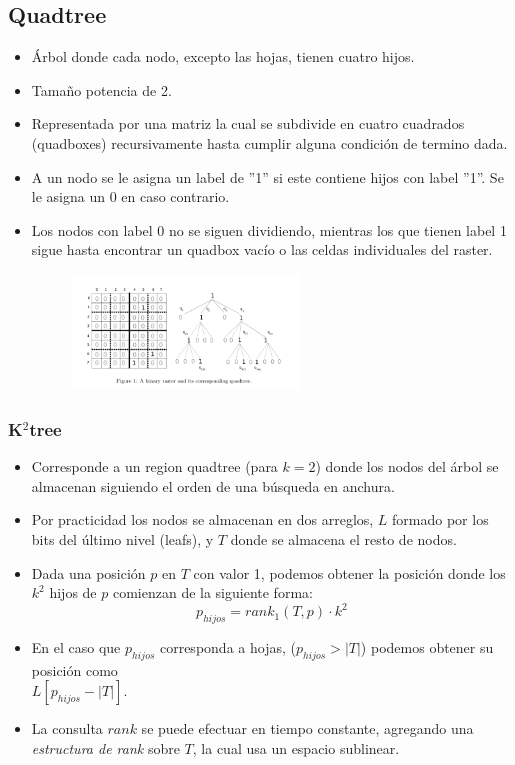 \documentclass{article}
\begin{document}
\subsection*{Quadtree}
\begin{itemize}
  \item Árbol donde cada nodo, excepto las hojas, tienen cuatro hijos.
  \item Tamaño potencia de 2.
  \item Representada por una matriz la cual se subdivide en cuatro cuadrados
    (quadboxes) recursivamente hasta cumplir alguna condición de termino dada.
  \item A un nodo se le asigna un label de ''1'' si este contiene hijos con
    label ''1''. Se le asigna un 0 en caso contrario.
  \item Los nodos con label 0 no se siguen dividiendo, mientras los que tienen
    label 1 sigue hasta encontrar un quadbox vacío o las celdas individuales del
    raster.
  \begin{figure}[h]
    \centering
    \includegraphics[width=0.57\textwidth]{../images/quad.png}
  \end{figure}
\end{itemize}

\subsubsection*{K$^2$tree}
\begin{itemize}
  \item Corresponde a un region quadtree (para $k = 2$) donde los nodos del árbol se almacenan
    siguiendo el orden de una búsqueda en anchura.
  \item Por practicidad los nodos se almacenan en dos arreglos, $L$ formado por
    los bits del último nivel (leafs), y $T$ donde se almacena el resto de nodos.
  \item Dada una posición $p$ en $T$ con valor 1, podemos obtener la posición
    donde los $k^2$ hijos de $p$ comienzan de la siguiente forma: \[
      p_{hijos} = rank_1(T, p) \cdot k^2
    \]
  \item En el caso que $p_{hijos}$ corresponda a hojas, ($p_{hijos} > |T|$)
    podemos obtener su posición como\\ $L[p_{hijos} - |T|]$.
  \item La consulta $rank$ se puede efectuar en tiempo constante, agregando una
    \emph{estructura de rank} sobre $T$, la cual usa un espacio sublinear.
\end{itemize}
\end{document}
